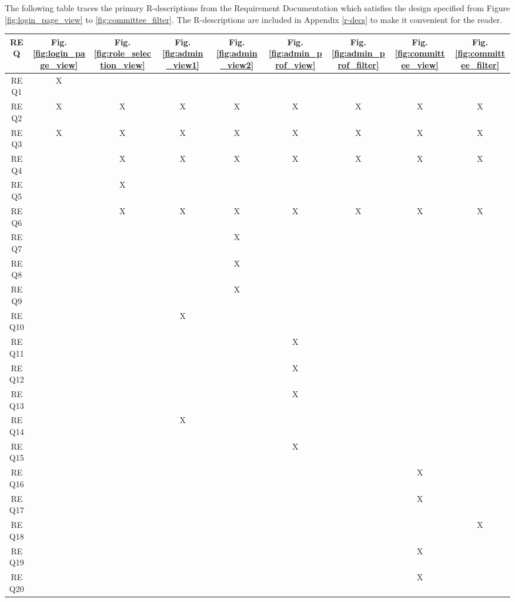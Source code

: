 \documentclass[fontsize=12pt,paper=letter,twoside]{scrartcl}
\begin{document}
The following table traces the primary R-descriptions from the Requirement Documentation which satisfies the design specified from Figure \ref{fig:login_page_view} to \ref{fig:committee_filter}. The R-descriptions are included in Appendix \ref{r-decs} to make it convenient for the reader.

\begin{table}[h]
\centering
\begin{tabular}{| c | c | c | c | c | c | c | c | c |}
	\cline{1-9}
	\textbf{REQ} & \textbf{Fig. \ref{fig:login_page_view}} & \textbf{Fig. \ref{fig:role_selection_view}} & \textbf{Fig. \ref{fig:admin_view1}} & \textbf{Fig. \ref{fig:admin_view2}} & \textbf{Fig. \ref{fig:admin_prof_view}} & \textbf{Fig. \ref{fig:admin_prof_filter}} & \textbf{Fig. \ref{fig:committee_view}} & \textbf{Fig. \ref{fig:committee_filter}}\\ \hline
	REQ1 & X & & & & & & & \\ \hline
	REQ2 & X & X & X & X & X & X & X & X \\ \hline
	REQ3 & X & X & X & X & X & X & X & X \\ \hline
	REQ4 & & X & X & X & X & X & X & X \\ \hline
	REQ5 & & X & & & & & & \\ \hline
	
	REQ6 & & X & X & X & X & X & X & X \\ \hline
	REQ7 & & & & X & & & & \\ \hline
	REQ8 & & & & X & & & & \\ \hline
	REQ9 & & & & X & & & & \\ \hline
	REQ10 & & & X & & & & & \\ \hline
	
	REQ11 & & & & & X & & & \\ \hline
	REQ12 & & & & & X & & & \\ \hline
	REQ13 & & & & & X & & & \\ \hline
	REQ14 & & & X & & & & & \\ \hline
	REQ15 & & & & & X & & & \\ \hline
	
	REQ16 & & & & & & & X & \\ \hline
	REQ17 & & & & & & & X & \\ \hline
	REQ18 & & & & & & & & X \\ \hline
	REQ19 & & & & & & & X & \\ \hline
	REQ20 & & & & & & & X & \\ \hline
	

\end{tabular}
\end{table}
\end{document}
